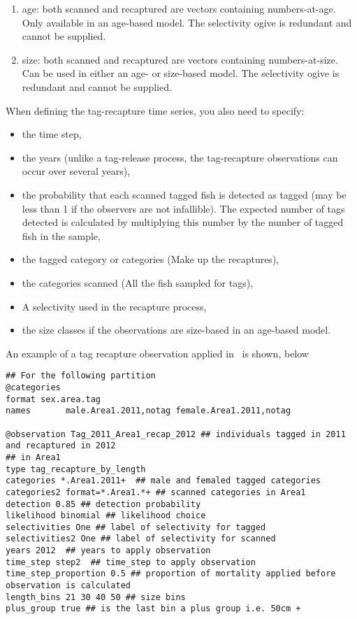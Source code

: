 {{{{\begin{enumerate}
	\item age: both scanned and recaptured are vectors containing numbers-at-age. Only available in an age-based model. The selectivity ogive is redundant and cannot be supplied.
	\item size: both scanned and recaptured are vectors containing numbers-at-size. Can be used in either an age- or size-based model. The selectivity ogive is redundant and cannot be supplied.
\end{enumerate}
When defining the tag-recapture time series, you also need to specify:
\begin{itemize}
	\item the time step,
	\item the years (unlike a tag-release process, the tag-recapture observations can occur over several years),
	\item the probability that each scanned tagged fish is detected as tagged (may be less than 1 if the observers are not infallible). The expected number of tags detected is calculated by multiplying this number by the number of tagged fish in the sample,
	\item the tagged category or categories (Make up the recaptures),
	\item the categories scanned (All the fish sampled for tags),
	\item A selectivity used in the recapture process,
	\item the size classes if the observations are size-based in an age-based model.
\end{itemize}


An example of a tag recapture observation applied in \CNAME\ is shown, below
{\small{\begin{verbatim}
## For the following partition
@categories
format sex.area.tag
names  		male.Area1.2011,notag female.Area1.2011,notag
		
@observation Tag_2011_Area1_recap_2012 ## individuals tagged in 2011 and recaptured in 2012
## in Area1
type tag_recapture_by_length
categories *.Area1.2011+  ## male and femaled tagged categories
categories2 format=*.Area1.*+ ## scanned categories in Area1
detection 0.85 ## detection probability
likelihood binomial ## likelihood choice
selectivities One ## label of selectivity for tagged
selectivities2 One ## label of selectivity for scanned
years 2012  ## years to apply observation
time_step step2  ## time_step to apply observation	
time_step_proportion 0.5 ## proportion of mortality applied before observation is calculated 
length_bins 21 30 40 50	## size bins
plus_group true ## is the last bin a plus group i.e. 50cm +


\end{verbatim}}}}}}}
